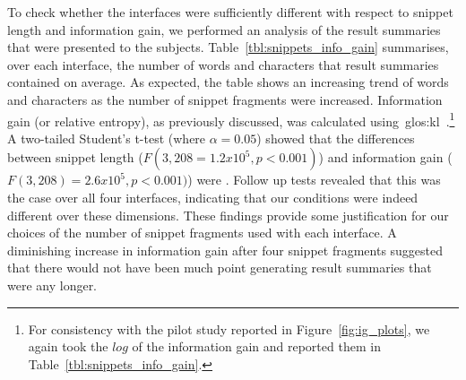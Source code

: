 To check whether the interfaces were sufficiently different with respect to snippet length and information gain, we performed an analysis of the result summaries that were presented to the subjects. Table~\ref{tbl:snippets_info_gain} summarises, over each interface, the number of words and characters that result summaries contained on average. As expected, the table shows an increasing trend of words and characters as the number of snippet fragments were increased. Information gain (or relative entropy), as previously discussed, was calculated using~\gls{glos:kl}~\citep{kullback1951information}.\footnote{For consistency with the pilot study reported in Figure~\ref{fig:ig_plots}, we again took the $log$ of the information gain and reported them in Table~\ref{tbl:snippets_info_gain}.} A two-tailed Student's t-test (where $\alpha=0.05$) showed that the differences between snippet length ($F(3,208 = 1.2x10^5, p<0.001)$) and information gain ($F(3,208) = 2.6x10^5, p<0.001)$) were . Follow up tests revealed that this was the case over all four interfaces, indicating that our conditions were indeed different over these dimensions. These findings provide some justification for our choices of the number of snippet fragments used with each interface. A diminishing increase in information gain after four snippet fragments suggested that there would not have been much point generating result summaries that were any longer.


